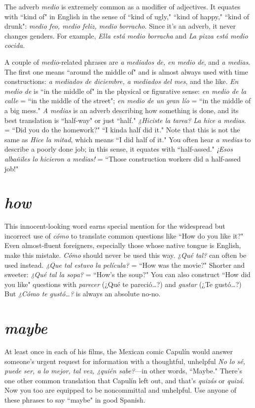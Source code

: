The adverb \emph{medio} is extremely common as a modifier of adjectives. It equates with ``kind of" in English in the sense of ``kind of
ugly," ``kind of happy," ``kind of drunk": \emph{medio feo, medio feliz, medio
	borracho}. Since it's an adverb, it never changes genders. For example,
\emph{Ella está medio borracha} and \emph{La pizza está medio cocida}.

A couple of \emph{medio}-related phrases are \emph{a mediados de, en medio de}, and \emph{a medias}. The first one means ``around the middle of"
and is almost always used with time constructions: \emph{a mediados de diciembre, a mediados del mes}, and the like. \emph{En medio de} is ``in the
middle of" in the physical or figurative sense: \emph{en medio de la calle}
= ``in the middle of the street"; \emph{en medio de un gran lío} = ``in the
middle of a big mess." \emph{A medias} is an adverb describing how something is done, and its best translation is ``half-way" or just ``half." \emph{¿Hiciste la tarea? La hice a medias}. = ``Did you do the homework?" ``I
kinda half did it." Note that this is not the same as \emph{Hice la mitad},
which means ``I did half of it." You often hear \emph{a medias} to describe a
poorly done job; in this sense, it equates with ``half-assed." \emph{¡Esos albañiles lo hicieron a medias!} = ``Those construction workers did a
half-assed job!"

\section{\emph{how}}

This innocent-looking word earns special mention for the
widespread but incorrect use of \emph{cómo} to translate common questions
like ``How do you like it?" Even almost-fluent foreigners, especially
those whose native tongue is English, make this mistake. \emph{Cómo}
should never be used this way. \emph{¿Qué tal?} can often be used instead.
\emph{¿Que tal estuvo la película?} = ``How was the movie?" Shorter and
sweeter: \emph{¿Qué tal la sopa?} = ``How's the soup?" You can also construct ``How did you like" questions with \emph{parecer} (¿Qué te pareció\ldots{}?) and \emph{gustar} (¿Te gustó\ldots{}?) But \emph{¿Cómo te gustó\ldots{}?}
is always an absolute no-no.

\section{\emph{maybe}}

At least once in each of his films, the Mexican comic Capulín would answer someone's urgent request for information with a
thoughtful, unhelpful \emph{No lo sé, puede ser, a lo mejor, tal vez, ¿quién
	sabe?}---in other words, ``Maybe." There's one other common translation that Capulín left out, and that's \emph{quizás} or \emph{quizá}. Now you too
are equipped to be noncommittal and unhelpful. Use anyone of these
phrases to say ``maybe" in good Spanish.

